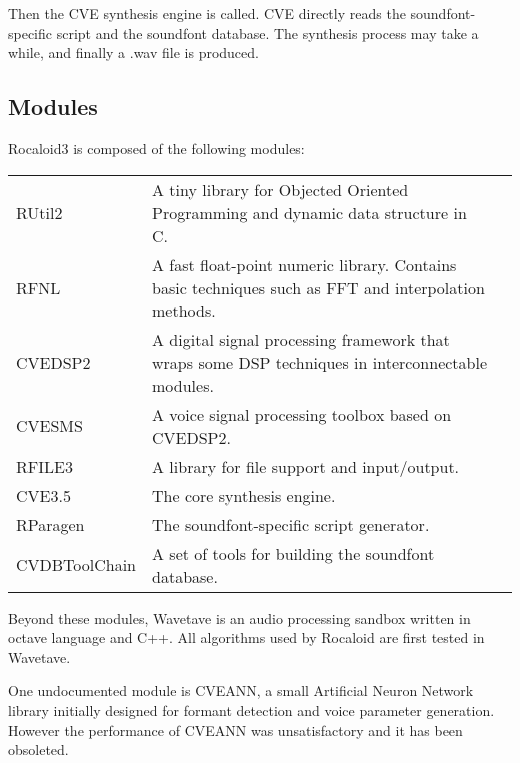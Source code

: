         Then the CVE synthesis engine is called. CVE directly reads the soundfont-specific script and the soundfont database. The synthesis process may take a while, and finally a .wav file is produced.

\subsection{Modules}\indent

        Rocaloid3 is composed of the following modules:
        
        \bigskip
        \begin{tabular}{lll}
        	RUtil2 & \parbox{9.5cm}{A tiny library for Objected Oriented Programming and dynamic data structure in C.}\\
        	RFNL & \parbox{9.5cm}{A fast float-point numeric library. Contains basic techniques such as FFT and interpolation methods.}\\
        	CVEDSP2 & \parbox{9.5cm}{A digital signal processing framework that wraps some DSP techniques in interconnectable modules.}\\
        	CVESMS & \parbox{9.5cm}{A voice signal processing toolbox based on CVEDSP2.}\\
        	RFILE3 & \parbox{9.5cm}{A library for file support and input/output.}\\
        	CVE3.5 & \parbox{9.5cm}{The core synthesis engine.}\\
        	RParagen & \parbox{9.5cm}{The soundfont-specific script generator.}\\
        	CVDBToolChain & \parbox{9.5cm}{A set of tools for building the soundfont database.}\\
        \end{tabular}
        \bigskip
        
        Beyond these modules, Wavetave is an audio processing sandbox written in octave language and C++. All algorithms used by Rocaloid are first tested in Wavetave.
        
        One undocumented module is CVEANN, a small Artificial Neuron Network library initially designed for formant detection and voice parameter generation. However the performance of CVEANN was unsatisfactory and it has been obsoleted.

        


